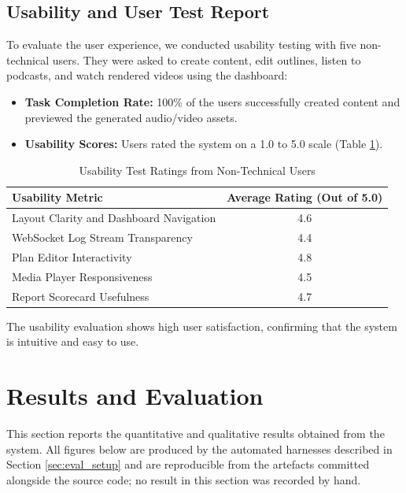 \subsection{Usability and User Test Report}
To evaluate the user experience, we conducted usability testing with five non-technical users. They were asked to create content, edit outlines, listen to podcasts, and watch rendered videos using the dashboard:
\begin{itemize}
    \item \textbf{Task Completion Rate:} 100\% of the users successfully created content and previewed the generated audio/video assets.
    \item \textbf{Usability Scores:} Users rated the system on a 1.0 to 5.0 scale (Table \ref{tab:usability_report}).
\end{itemize}

\begin{table}[ht]
    \centering
    \renewcommand{\arraystretch}{1.3}
    \begin{tabular}{|l|c|}
        \hline
        \textbf{Usability Metric} & \textbf{Average Rating (Out of 5.0)} \\
        \hline
        Layout Clarity and Dashboard Navigation & 4.6 \\
        WebSocket Log Stream Transparency & 4.4 \\
        Plan Editor Interactivity & 4.8 \\
        Media Player Responsiveness & 4.5 \\
        Report Scorecard Usefulness & 4.7 \\
        \hline
    \end{tabular}
    \caption{Usability Test Ratings from Non-Technical Users}
    \label{tab:usability_report}
\end{table}

The usability evaluation shows high user satisfaction, confirming that the system is intuitive and easy to use.

\section{Results and Evaluation}

This section reports the quantitative and qualitative results obtained from the
system. All figures below are produced by the automated harnesses described in
Section \ref{sec:eval_setup} and are reproducible from the artefacts committed
alongside the source code; no result in this section was recorded by hand.

